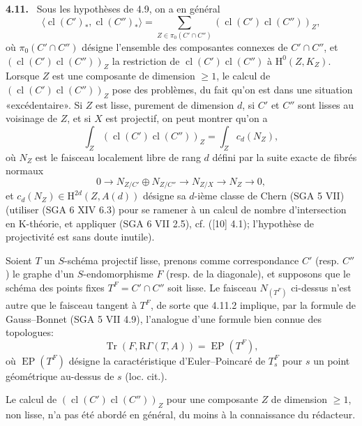 \documentclass[11pt]{article}
\newenvironment{statement}[1]{\par\medskip\noindent\textbf{#1.}\ }{\par\medskip}
\renewcommand{\H}{\mathrm{H}}
\newcommand{\R}{\mathrm{R}}
\providecommand{\cl}{\operatorname{cl}}
\providecommand{\Tr}{\operatorname{Tr}}
\providecommand{\EP}{\operatorname{EP}}
\providecommand{\Tr}{\operatorname{Tr}}
\providecommand{\Tr}{\operatorname{Tr}}
\providecommand{\R}{\mathrm R}
\providecommand{\Tr}{\operatorname{Tr}}
\providecommand{\cl}{\operatorname{cl}}
\providecommand{\EP}{\operatorname{EP}}
\providecommand{\cl}{\operatorname{cl}}
\providecommand{\Tr}{\operatorname{Tr}}
\begin{document}
\begin{statement}{4.11}
Sous les hypothèses de 4.9, on a en général
\begin{equation}
\tag{4.11.1}
\langle \cl(C')_*,\cl(C'')_*\rangle
=
\sum_{Z\in\pi_0(C'\cap C'')}(\cl(C')\cl(C''))_Z,
\end{equation}
où $\pi_0(C'\cap C'')$ désigne l'ensemble des composantes connexes de $C'\cap C''$, et $(\cl(C')\cl(C''))_Z$ la restriction de $\cl(C')\cl(C'')$ à $\H^0(Z,K_Z)$. Lorsque $Z$ est une composante de dimension $\geq 1$, le calcul de $(\cl(C')\cl(C''))_Z$ pose des problèmes, du fait qu'on est dans une situation «excédentaire». Si $Z$ est lisse, purement de dimension $d$, si $C'$ et $C''$ sont lisses au voisinage de $Z$, et si $X$ est projectif, on peut montrer qu'on a
\begin{equation}
\tag{4.11.2}
\int_Z(\cl(C')\cl(C''))_Z=\int_Z c_d(N_Z),
\end{equation}
où $N_Z$ est le faisceau localement libre de rang $d$ défini par la suite exacte de fibrés normaux
\[
0\longrightarrow N_{Z/C'}\oplus N_{Z/C''}\longrightarrow N_{Z/X}\longrightarrow N_Z\longrightarrow 0,
\]
et $c_d(N_Z)\in \H^{2d}(Z,A(d))$ désigne sa $d$-ième classe de Chern (SGA 5 VII) (utiliser (SGA 6 XIV 6.3) pour se ramener à un calcul de nombre d'intersection en K-théorie, et appliquer (SGA 6 VII 2.5), cf. ([10] 4.1); l'hypothèse de projectivité est sans doute inutile).

Soient $T$ un $S$-schéma projectif lisse, prenons comme correspondance $C'$ (resp. $C''$) le graphe d'un $S$-endomorphisme $F$ (resp. de la diagonale), et supposons que le schéma des points fixes $T^F=C'\cap C''$ soit lisse. Le faisceau $N_{(T^F)}$ ci-dessus n'est autre que le faisceau tangent à $T^F$, de sorte que 4.11.2 implique, par la formule de Gauss--Bonnet (SGA 5 VII 4.9), l'analogue d'une formule bien connue des topologues:
\begin{equation}
\tag{4.11.3}
\Tr(F,\R\Gamma(T,A))=\EP(T^F),
\end{equation}
où $\EP(T^F)$ désigne la caractéristique d'Euler--Poincaré de $T_s^F$ pour $s$ un point géométrique au-dessus de $s$ (loc. cit.).
\end{statement}

Le calcul de $(\cl(C')\cl(C''))_Z$ pour une composante $Z$ de dimension $\geq 1$, non lisse, n'a pas été abordé en général, du moins à la connaissance du rédacteur.
\end{document}
